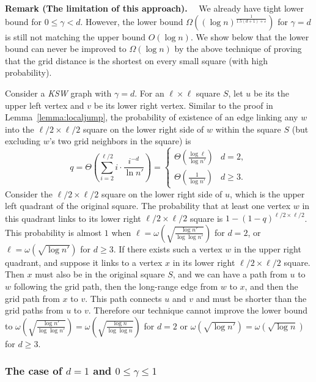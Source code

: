 \documentclass[11pt]{article}
\def\KSW{{\it KSW }}
\begin{document}
\noindent
{\bf Remark (The limitation of this approach).}
\ \ 
We already have tight lower bound for $0\leq\gamma<d$. 
However, the lower bound $\Omega((\log n)^{\frac{1}{1.5(d+1)+\varepsilon}})$ for $\gamma=d$ 
	is still not matching the upper bound $O(\log n)$. 
We show below that the lower bound can never be improved to $\Omega(\log n)$ 
	by the above technique of 
	proving that the grid distance is the shortest on every small square 
	(with high probability).

Consider a \KSW graph with $\gamma=d$. 
For an $\ell\times \ell$ square $S$, let $u$ be its the upper left vertex 
	and $v$ be its lower right vertex. 
Similar to the proof in Lemma~\ref{lemma:localjump}, the probability of 
	existence of an edge linking any $w$ into the $\ell/2\times \ell/2$ square 
	on the lower right side of $w$ within the square $S$ (but
	excluding $w$'s two grid neighbors in the square) is 
\[q=\Theta\left(\sum_{i=2}^{\ell/2}i\cdot\frac{i^{-d}}{\ln n'}\right)=
	\begin{cases}\Theta(\frac{\log \ell}{\log n'}) & d=2,\\ \Theta(\frac{1}{\log n'}) & d\geq3.\end{cases}\]
Consider the $\ell/2\times \ell/2$ square on the lower right side of $u$, which
	is the upper left quadrant of the original square. 
The probability that at least one vertex $w$ in this quadrant links 
	to its lower right $\ell/2\times \ell/2$ square is 
	$1-(1-q)^{\ell/2\times \ell/2}$. 
This probability is almost $1$ when 
	$\ell = \omega\left(\sqrt{\frac{\log n'}{\log\log n'}}\right)$ for $d=2$, 
	or $\ell = \omega(\sqrt{\log n'})$ for $d\geq3$. 
If there exists such a vertex $w$ in the upper right quadrant, 
	and suppose it links to a vertex $x$ in its lower right 
	$\ell/2\times \ell/2$ square.
Then $x$ must also be in the original square $S$, and we can have a path from 
	$u$ to $w$ following the grid path, then the long-range edge from 
	$w$ to $x$, and then the grid path from $x$ to $v$.
This path connects $u$ and $v$ and must be shorter than the grid paths
	from $u$ to $v$.
Therefore our technique cannot improve the lower bound to
	$\omega\left(\sqrt{\frac{\log n'}{\log\log n'}}\right)=\omega\left(\sqrt{\frac{\log n}{\log\log n}}\right)$ for $d=2$ 
	or $\omega(\sqrt{\log n'})=\omega(\sqrt{\log n})$ for $d\ge 3$.


\subsubsection{The case of $d=1$ and $0 \le \gamma \le 1$} \label{sec:1dsmallr}
\end{document}
